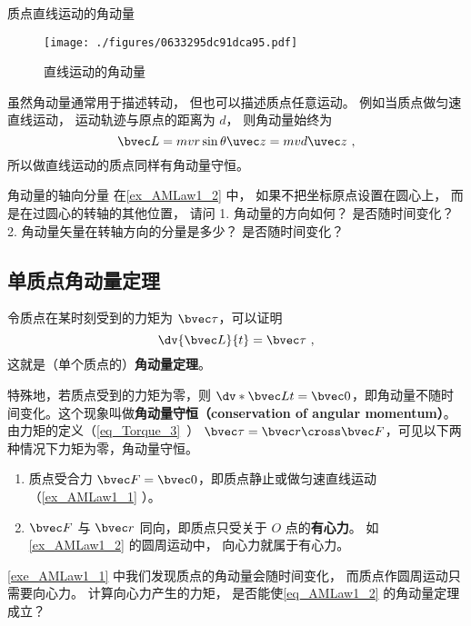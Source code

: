 \begin{example}{质点直线运动的角动量}\label{ex_AMLaw1_1}
\begin{figure}[ht]
\centering
\texttt{[image: ./figures/0633295dc91dca95.pdf]}
\caption{直线运动的角动量} \label{fig_AMLaw1_2}
\end{figure}
虽然角动量通常用于描述转动， 但也可以描述质点任意运动。 例如当质点做匀速直线运动， 运动轨迹与原点的距离为 $d$， 则角动量始终为
\begin{equation}
\bvec L = mvr\sin\theta \uvec z =  mvd \uvec z~,
\end{equation}
所以做直线运动的质点同样有角动量守恒。
\end{example}

\begin{exercise}{角动量的轴向分量}\label{exe_AMLaw1_1}
在\autoref{ex_AMLaw1_2} 中， 如果不把坐标原点设置在圆心上， 而是在过圆心的转轴的其他位置， 请问 1. 角动量的方向如何？ 是否随时间变化？ 2. 角动量矢量在转轴方向的分量是多少？ 是否随时间变化？
\end{exercise}

\subsection{单质点角动量定理}
令质点在某时刻受到的力矩为 $\bvec \tau$，可以证明
\begin{equation}\label{eq_AMLaw1_2}
\dv{\bvec L}{t} = \bvec \tau~,
\end{equation} 
这就是（单个质点的）\textbf{角动量定理}。

特殊地，若质点受到的力矩为零，则 $ \dv*{\bvec L}{t} = \bvec 0$，即角动量不随时间变化。这个现象叫做\textbf{角动量守恒（conservation of angular momentum）}。由力矩的定义（\autoref{eq_Torque_3}~） $\bvec \tau = \bvec r \cross \bvec F$，可见以下两种情况下力矩为零，角动量守恒。
\begin{enumerate}
\item 质点受合力 $\bvec F= \bvec 0$，即质点静止或做匀速直线运动（\autoref{ex_AMLaw1_1} ）。
\item $\bvec F$ 与 $\bvec r$ 同向，即质点只受关于 $O$ 点的\textbf{有心力}。 如\autoref{ex_AMLaw1_2} 的圆周运动中， 向心力就属于有心力。
\end{enumerate}

\begin{exercise}{}
\autoref{exe_AMLaw1_1} 中我们发现质点的角动量会随时间变化， 而质点作圆周运动只需要向心力。 计算向心力产生的力矩， 是否能使\autoref{eq_AMLaw1_2} 的角动量定理成立？
\end{exercise}

